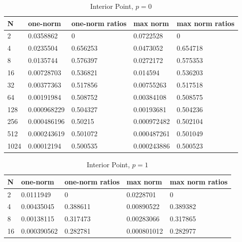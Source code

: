 \documentclass{article} %
\theoremstyle{plain}
\numberwithin{equation}{section} %
\numberwithin{figure}{section} %
\numberwithin{table}{section} %
\begin{document}
\begin{enumerate}[\ \ (a)]
\begin{table}
            \caption{Interior Point, $p=0$}
            \begin{tabular}[ht!]{lllll}
                \hline
                    N &    one-norm &   one-norm ratios &    max norm &   max norm ratios \\
                \hline
                    2 & 0.0358862   &          0        & 0.0722528   &          0        \\
                    4 & 0.0235504   &          0.656253 & 0.0473052   &          0.654718 \\
                    8 & 0.0135744   &          0.576397 & 0.0272172   &          0.575353 \\
                   16 & 0.00728703  &          0.536821 & 0.014594    &          0.536203 \\
                   32 & 0.00377363  &          0.517856 & 0.00755263  &          0.517518 \\
                   64 & 0.00191984  &          0.508752 & 0.00384108  &          0.508575 \\
                  128 & 0.000968229 &          0.504327 & 0.00193681  &          0.504236 \\
                  256 & 0.000486196 &          0.50215  & 0.000972482 &          0.502104 \\
                  512 & 0.000243619 &          0.501072 & 0.000487261 &          0.501049 \\
                 1024 & 0.00012194  &          0.500535 & 0.000243886 &          0.500523 \\
                \hline
            \end{tabular}
        \end{table}
        \begin{table}
            \centering
            \caption{Interior Point, $p=1$}
            \begin{tabular}[ht!]{lllll}
                \hline
                    N &    one-norm &   one-norm ratios &    max norm &   max norm ratios \\
                \hline
                    2 & 0.0111949   &          0        & 0.0228701   &          0        \\
                    4 & 0.00435045  &          0.388611 & 0.00890522  &          0.389382 \\
                    8 & 0.00138115  &          0.317473 & 0.00283066  &          0.317865 \\
                   16 & 0.000390562 &          0.282781 & 0.000801012 &          0.282977 \\

\end{tabular}
\end{table}
\end{enumerate}
\end{document}
